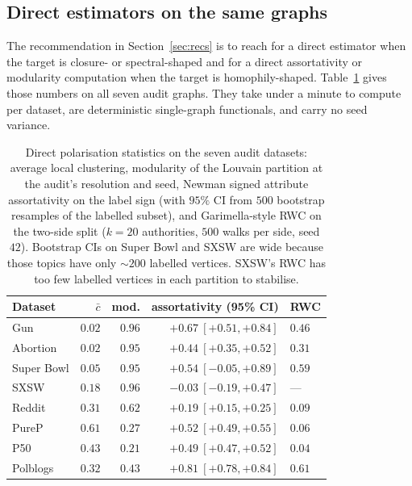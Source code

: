 \documentclass[letterpaper]{article} %
\begin{document}
\subsection{Direct estimators on the same graphs}\label{sec:direct}

The recommendation in Section~\ref{sec:recs} is to reach for a
direct estimator when the target is closure- or spectral-shaped
and for a direct assortativity or modularity computation when
the target is homophily-shaped. Table~\ref{tab:direct} gives
those numbers on all seven audit graphs. They take under a
minute to compute per dataset, are deterministic single-graph
functionals, and carry no seed variance.

\begin{table}[t]
\centering
\small
\setlength{\tabcolsep}{4pt}
\begin{tabular}{lrrrl}
\toprule
Dataset & $\bar c$ & mod. & assortativity (95\% CI) & RWC \\
\midrule
Gun         & $0.02$ & $0.96$ & $+0.67\ [+0.51, +0.84]$ & $0.46$ \\
Abortion    & $0.02$ & $0.95$ & $+0.44\ [+0.35, +0.52]$ & $0.31$ \\
Super Bowl  & $0.05$ & $0.95$ & $+0.54\ [-0.05, +0.89]$ & $0.59$ \\
SXSW        & $0.18$ & $0.96$ & $-0.03\ [-0.19, +0.47]$ & --- \\
Reddit      & $0.31$ & $0.62$ & $+0.19\ [+0.15, +0.25]$ & $0.09$ \\
PureP       & $0.61$ & $0.27$ & $+0.52\ [+0.49, +0.55]$ & $0.06$ \\
P50         & $0.43$ & $0.21$ & $+0.49\ [+0.47, +0.52]$ & $0.04$ \\
Polblogs    & $0.32$ & $0.43$ & $+0.81\ [+0.78, +0.84]$ & $0.61$ \\
\bottomrule
\end{tabular}
\caption{Direct polarisation statistics on the seven audit
datasets: average local clustering, modularity of the Louvain
partition at the audit's resolution and seed, Newman signed
attribute assortativity on the label sign (with $95\%$ CI
from $500$ bootstrap resamples of the labelled subset), and
Garimella-style RWC on the two-side split ($k = 20$
authorities, $500$ walks per side, seed $42$). Bootstrap CIs
on Super Bowl and SXSW are wide because those topics have
only $\sim\!200$ labelled vertices. SXSW's RWC has too few
labelled vertices in each partition to
stabilise.}\label{tab:direct}
\end{table}
\end{document}

